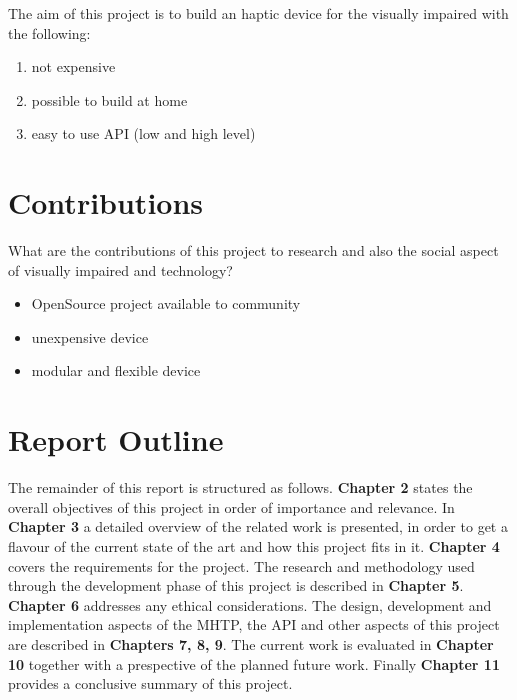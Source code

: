The aim of this project is to build an haptic device for the visually impaired with the following:
	\begin{enumerate}
    	\item not expensive
        \item possible to build at home
        \item easy to use API (low and high level)
        
    \end{enumerate}

\section{Contributions}

What are the contributions of this project to research and also the social aspect of visually impaired and technology? 

\begin{itemize}
	\item OpenSource project available to community
    \item unexpensive device 
    \item modular and flexible device
\end{itemize}

\section{Report Outline}
The remainder of this report is structured as follows. \textbf{Chapter 2} states the overall objectives of this project in order of importance and relevance. In \textbf{Chapter 3} a detailed overview of the related work is presented, in order to get a flavour of the current state of the art and how this project fits in it. \textbf{Chapter 4} covers the requirements for the project. The research and methodology used through the development phase of this project is described in \textbf{Chapter 5}. \textbf{Chapter 6} addresses any ethical considerations. The design, development and implementation aspects of the MHTP, the API and other aspects of this project are described in \textbf{Chapters 7, 8, 9}. The current work is evaluated in \textbf{Chapter 10} together with a prespective of the planned future work. Finally \textbf{Chapter 11} provides a conclusive summary of this project.